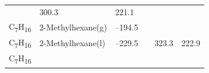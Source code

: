 \documentclass[
]{book}
\theoremstyle{definition}
\theoremstyle{definition}
\theoremstyle{definition}
\theoremstyle{remark}
\begin{document}
\begin{longtable}[]{@{}llllll@{}}
\begin{minipage}[t]{0.15\columnwidth}
\strut
\end{minipage} & \begin{minipage}[t]{0.14\columnwidth}\raggedright
300.3\strut
\end{minipage} & \begin{minipage}[t]{0.14\columnwidth}\raggedright
221.1\strut
\end{minipage}\tabularnewline
\begin{minipage}[t]{0.07\columnwidth}\raggedright
C\textsubscript{7}H\textsubscript{16}\strut
\end{minipage} & \begin{minipage}[t]{0.17\columnwidth}\raggedright
2-Methylhexane(g)\strut
\end{minipage} & \begin{minipage}[t]{0.15\columnwidth}\raggedright
--194.5\strut
\end{minipage} & \begin{minipage}[t]{0.15\columnwidth}\raggedright
\strut
\end{minipage} & \begin{minipage}[t]{0.14\columnwidth}\raggedright
\strut
\end{minipage} & \begin{minipage}[t]{0.14\columnwidth}\raggedright
\strut
\end{minipage}\tabularnewline
\begin{minipage}[t]{0.07\columnwidth}\raggedright
C\textsubscript{7}H\textsubscript{16}\strut
\end{minipage} & \begin{minipage}[t]{0.17\columnwidth}\raggedright
2-Methylhexane(l)\strut
\end{minipage} & \begin{minipage}[t]{0.15\columnwidth}\raggedright
--229.5\strut
\end{minipage} & \begin{minipage}[t]{0.15\columnwidth}\raggedright
\strut
\end{minipage} & \begin{minipage}[t]{0.14\columnwidth}\raggedright
323.3\strut
\end{minipage} & \begin{minipage}[t]{0.14\columnwidth}\raggedright
222.9\strut
\end{minipage}\tabularnewline
\begin{minipage}[t]{0.07\columnwidth}\raggedright
C\textsubscript{7}H\textsubscript{16}\strut
\end{minipage} & \begin{minipage}[t]{0.17\columnwidth}\raggedright

\end{minipage}
\end{longtable}
\end{document}
